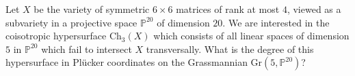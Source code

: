 Let $X$ be the variety of symmetric $6\times 6$ matrices of rank at most $4$, viewed as a subvariety in a projective space $\mathbb{P}^{20}$ of dimension $20$. We are interested in the coisotropic hypersurface $\mathrm{Ch}_3(X)$ which consists of all linear spaces of dimension $5$ in $\mathbb{P}^{20}$ which fail to intersect $X$ transversally. What is the degree of this hypersurface in Pl\"ucker coordinates on the Grassmannian $\mathrm{Gr}(5,\mathbb{P}^{20})$?
